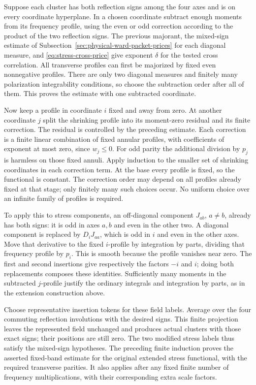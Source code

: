 Suppose each cluster has both reflection signs among the four axes and
is on every coordinate hyperplane. In a chosen coordinate subtract enough
moments from its frequency profile, using the even or odd correction
according to the product of the two reflection signs. The previous
majorant, the mixed-sign estimate of
Subsection~\ref{sec:physical-ward-packet-prices} for each diagonal measure,
and \eqref{eq:stress-cross-price} give exponent $\delta$ for the tested
cross correlation. All transverse profiles can first be majorized by fixed
even nonnegative profiles. There are only two diagonal measures and finitely
many polarization integrability conditions, so choose the subtraction order
after all of them. This proves the estimate with one subtracted coordinate.

Now keep a profile in coordinate $i$ fixed and away from zero. At another
coordinate $j$ split the shrinking profile into its moment-zero residual
and its finite correction. The residual is controlled by the preceding
estimate. Each correction is a finite linear combination of fixed annular
profiles, with coefficients of exponent at most zero, since $w_j\leq0$.
For odd parity the additional division by $p_j$ is harmless on those fixed
annuli. Apply induction to the smaller set of shrinking coordinates in
each correction term. At the base every profile is fixed, so the functional
is constant. The correction order may depend on all profiles already fixed
at that stage; only finitely many such choices occur. No uniform choice
over an infinite family of profiles is required.

To apply this to stress components, an off-diagonal component $J_{ab}$,
$a\ne b$, already has both signs: it is odd in axes $a,b$ and even in
the other two. A diagonal component is replaced by $D_iJ_{aa}$, which
is odd in $i$ and even in the other axes. Move that derivative to the
fixed $i$-profile by integration by parts, dividing that frequency profile
by $p_i$. This is smooth because the profile vanishes near zero.
The first and second insertions give respectively the factors $-i$ and
$i$; doing both replacements composes these identities. Sufficiently many
moments in the subtracted $j$-profile justify the ordinary integrals and
integration by parts, as in the extension construction above.

Choose representative insertion tokens for these field labels. Average
over the four commuting reflection involutions with the desired signs.
This finite projection leaves the represented field unchanged and produces
actual clusters with those exact signs; their positions are still zero.
The two modified stress labels thus satisfy the mixed-sign hypotheses.
The preceding finite induction proves the asserted fixed-band estimate
for the original extended stress functional, with the required transverse
parities. It also applies after any fixed finite number of frequency
multiplications, with their corresponding extra scale factors.


